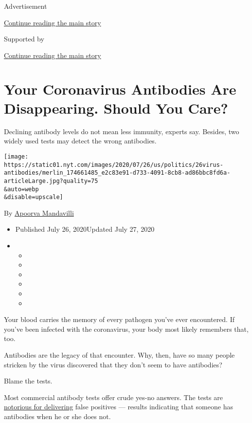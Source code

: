 Advertisement

\protect\hyperlink{after-top}{Continue reading the main story}

Supported by

\protect\hyperlink{after-sponsor}{Continue reading the main story}

\hypertarget{your-coronavirus-antibodies-are-disappearing-should-you-care}{%
\section{Your Coronavirus Antibodies Are Disappearing. Should You
Care?}\label{your-coronavirus-antibodies-are-disappearing-should-you-care}}

Declining antibody levels do not mean less immunity, experts say.
Besides, two widely used tests may detect the wrong antibodies.

\texttt{[image: https://static01.nyt.com/images/2020/07/26/us/politics/26virus-antibodies/merlin\_174661485\_e2c83e91-d733-4091-8cb8-ad86bbc8fd6a-articleLarge.jpg?quality=75\\\&auto=webp\\\&disable=upscale]}

By \href{https://www.nytimes.com/by/apoorva-mandavilli}{Apoorva
Mandavilli}

\begin{itemize}
\item
  Published July 26, 2020Updated July 27, 2020
\item
  \begin{itemize}
  \item
  \item
  \item
  \item
  \item
  \item
  \end{itemize}
\end{itemize}

Your blood carries the memory of every pathogen you've ever encountered.
If you've been infected with the coronavirus, your body most likely
remembers that, too.

Antibodies are the legacy of that encounter. Why, then, have so many
people stricken by the virus discovered that they don't seem to have
antibodies?

Blame the tests.

Most commercial antibody tests offer crude yes-no answers. The tests are
\href{https://www.nytimes.com/2020/04/24/health/coronavirus-antibody-tests.html}{notorious
for delivering} false positives --- results indicating that someone has
antibodies when he or she does not.

